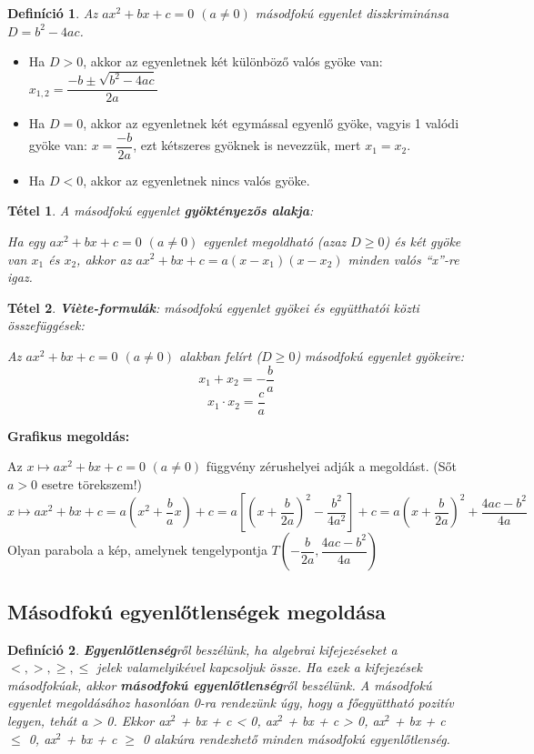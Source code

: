 \documentclass[12pt,a4paper]{article}
\newtheorem{theorem}{Tétel} [section]
\newtheorem{definition}{Definíció} [section]
\begin{document}
\begin{definition}
Az $ax^2 + bx + c = 0$ $(a \neq 0)$ másodfokú egyenlet diszkriminánsa $D = b^2 - 4ac$.
\end{definition}
\begin{itemize}
\item Ha $D > 0$, akkor az egyenletnek két különböző valós gyöke van: $x_{1,2}=\dfrac{-b\pm \sqrt{b^2-4ac}}{2a}$
\item  Ha $D = 0$, akkor az egyenletnek két egymással egyenlő gyöke, vagyis 1 valódi gyöke van: $x=\dfrac{-b}{2a}$, ezt kétszeres gyöknek is nevezzük, mert $x_1 = x_2$.
\item  Ha $D < 0$, akkor az egyenletnek nincs valós gyöke.
\end{itemize}

\begin{theorem}
A másodfokú egyenlet \textbf{gyöktényezős alakja}:

Ha egy $ax^2 + bx + c = 0$ $(a \neq 0)$ egyenlet megoldható (azaz $D \geq 0$) és két gyöke van $x_1$ és $x_2$, akkor az $ax^2 + bx + c = a(x - x_1)(x - x_2)$ minden valós ``x''-re igaz.
\end{theorem}

\begin{theorem}
\textbf{Viète-formulák}: másodfokú egyenlet gyökei és együtthatói közti összefüggések:

Az $ax^2 + bx + c = 0$ $(a \neq 0)$ alakban felírt ($D \geq 0$) másodfokú egyenlet gyökeire:
$$x_1+x_2=-\dfrac{b}{a}$$
$$x_1\cdot x_2=\dfrac{c}{a}$$
\end{theorem}

\textbf{Grafikus megoldás:}

Az $x\mapsto ax^2 + bx + c = 0$ $(a\neq 0)$ függvény zérushelyei adják a megoldást. (Sőt $a > 0$ esetre törekszem!)
$$x\mapsto ax^2 + bx + c =a\left(x^2+\dfrac{b}{a}x \right)+c=a\left[\left(x+\dfrac{b}{2a} \right)^2 - \dfrac{b^2}{4a^2} \right]+c=a\left(x+\dfrac{b}{2a} \right)^2+\dfrac{4ac-b^2}{4a}$$
Olyan parabola a kép, amelynek tengelypontja $T\left(-\dfrac{b}{2a}, \dfrac{4ac-b^2}{4a} \right)$

\subsection{Másodfokú egyenlőtlenségek megoldása}

\begin{definition}
\textbf{Egyenlőtlenség}ről beszélünk, ha algebrai kifejezéseket a $<, >, \geq, \leq$ jelek valamelyikével kapcsoljuk össze. Ha ezek a kifejezések másodfokúak, akkor \textbf{másodfokú egyenlőtlenség}ről beszélünk. A másodfokú egyenlet megoldásához hasonlóan 0-ra rendezünk úgy, hogy a főegyüttható pozitív legyen, tehát a > 0. Ekkor 
ax$^2$ + bx + c < 0,
ax$^2$ + bx + c > 0,
ax$^2$ + bx + c $\leq$ 0,
ax$^2$ + bx + c $\geq$ 0 alakúra rendezhető minden másodfokú egyenlőtlenség.
\end{definition}
\end{document}
